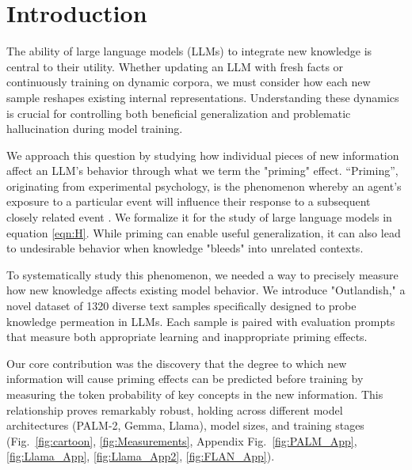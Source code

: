 \documentclass[11pt, a4paper, logo, copyright]{googledeepmind}
\theoremstyle{plain}
\theoremstyle{definition}
\theoremstyle{remark}
\begin{document}
\section{Introduction}
\label{sec:intro}


The ability of large language models (LLMs) to integrate new knowledge is central to their utility. Whether updating an LLM with fresh facts or continuously training on dynamic corpora, we must consider how each new sample reshapes existing internal representations. Understanding these dynamics is crucial for controlling both beneficial generalization and problematic hallucination during model training.

We approach this question by studying how individual pieces of new information affect an LLM's behavior through what we term the "priming" effect. ``Priming'', originating from experimental psychology, is the phenomenon whereby an agent's exposure to a particular event will influence their response to a subsequent closely related event \citep{priming, priming_meyer, priming_schacter}. We formalize it for the study of large language models in equation \eqref{eqn:H}. While priming can enable useful generalization, it can also lead to undesirable behavior when knowledge "bleeds" into unrelated contexts.

To systematically study this phenomenon, we needed a way to precisely measure how new knowledge affects existing model behavior. We introduce "Outlandish," a novel dataset of 1320 diverse text samples specifically designed to probe knowledge permeation in LLMs. Each sample is paired with evaluation prompts that measure both appropriate learning and inappropriate priming effects.

Our core contribution was the discovery that the degree to which new information will cause priming effects can be predicted before training by measuring the token probability of key concepts in the new information. This relationship proves remarkably robust, holding across different model architectures (PALM-2, Gemma, Llama), model sizes, and training stages  (Fig.~\ref{fig:cartoon}, \ref{fig:Measurements}, Appendix Fig.~\ref{fig:PALM_App}, \ref{fig:Llama_App}, \ref{fig:Llama_App2}, \ref{fig:FLAN_App}). 
\end{document}

